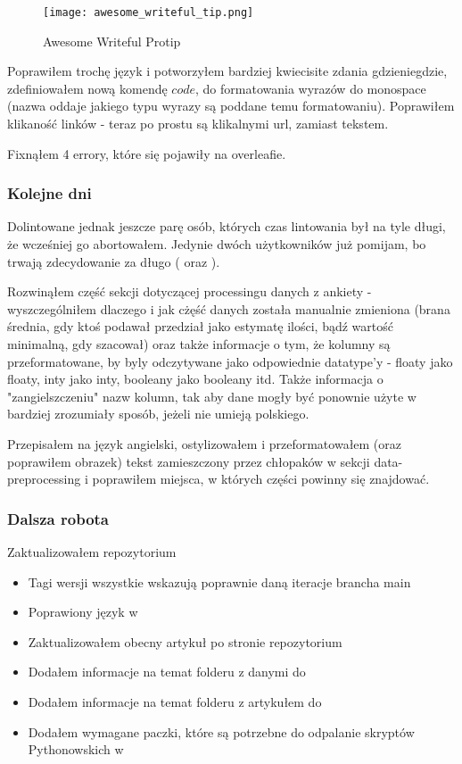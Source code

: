 \documentclass[graybox]{svmult}
\begin{document}
\begin{figure}[htp]
\centering
\texttt{[image: awesome\_writeful\_tip.png]}
\caption{Awesome Writeful Protip}
\label{fig:Writefull-Protip}
\end{figure}

Poprawiłem trochę język i potworzyłem bardziej kwiecisite zdania gdzieniegdzie, zdefiniowałem nową komendę $code{ }$, do formatowania wyrazów do monospace (nazwa oddaje jakiego typu wyrazy są poddane temu formatowaniu). Poprawiłem klikaność linków - teraz po prostu są klikalnymi url, zamiast tekstem. 

Fixnąłem 4 errory, które się pojawiły na overleafie.

\subsubsection{Kolejne dni}

Dolintowane jednak jeszcze parę osób, których czas lintowania był na tyle długi, że wcześniej go abortowałem. Jedynie dwóch użytkowników już pomijam, bo trwają zdecydowanie za długo ( oraz ).



Rozwinąłem część sekcji dotyczącej processingu danych z ankiety - wyszczególniłem dlaczego i jak cżęść danych została manualnie zmieniona (brana średnia, gdy ktoś podawał przedział jako estymatę ilości, bądź wartość minimalną, gdy szacował) oraz także informacje o tym, że kolumny są przeformatowane, by byly odczytywane jako odpowiednie datatype'y - floaty jako floaty, inty jako inty, booleany jako booleany itd. Także informacja o "zangielszczeniu" nazw kolumn, tak aby dane mogły być ponownie użyte w bardziej zrozumiały sposób, jeżeli nie umieją polskiego.

Przepisałem na język angielski, ostylizowałem i przeformatowałem (oraz poprawiłem obrazek) tekst zamieszczony przez chłopaków w sekcji data-preprocessing i poprawiłem miejsca, w których części powinny się znajdować.

\subsubsection{Dalsza robota}

Zaktualizowałem repozytorium

\begin{itemize}
  \item Tagi wersji wszystkie wskazują poprawnie daną iteracje brancha main
  \item Poprawiony język w 
  \item Zaktualizowałem obecny artykuł po stronie repozytorium
  \item Dodałem informacje na temat folderu z danymi do 
  \item Dodałem informacje na temat folderu z artykułem do 
  \item Dodałem wymagane paczki, które są potrzebne do odpalanie skryptów Pythonowskich w 
\end{itemize}
\end{document}
